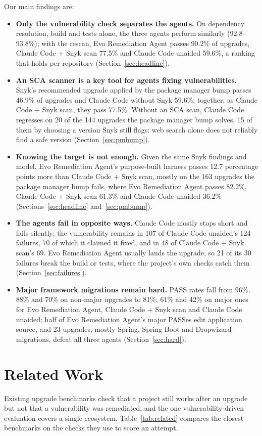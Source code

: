 \documentclass[11pt]{article}
\theoremstyle{definition}
\newcommand{\evo}{Evo Remediation Agent}
\newcommand{\aided}{Claude Code + Snyk scan}
\newcommand{\unaided}{Claude Code unaided}
\newcommand{\pmbump}{package manager bump}
\begin{document}
Our main findings are:
\begin{itemize}
  \item \textbf{Only the vulnerability check separates the agents.} On dependency resolution, build and tests alone, the three agents perform similarly (92.8--93.8\%); with the rescan, \evo{} passes 90.2\% of upgrades, \aided{} 77.5\% and \unaided{} 59.6\%, a ranking that holds per repository (Section~\ref{sec:headline}).
  \item \textbf{An SCA scanner is a key tool for agents fixing vulnerabilities.} Snyk's recommended upgrade applied by the \pmbump{} passes 46.9\% of upgrades and Claude Code without Snyk 59.6\%; together, as \aided{}, they pass 77.5\%. Without an SCA scan, Claude Code regresses on 20 of the 144 upgrades the \pmbump{} solves, 15 of them by choosing a version Snyk still flags: web search alone does not reliably find a safe version (Section~\ref{sec:pmbump}).
  \item \textbf{Knowing the target is not enough.} Given the same Snyk findings and model, \evo{}'s purpose-built harness passes 12.7 percentage points more than \aided{}, mostly on the 163 upgrades the \pmbump{} fails, where \evo{} passes 82.2\%, \aided{} 61.3\% and \unaided{} 36.2\% (Sections~\ref{sec:headline} and~\ref{sec:pmbump}).
  \item \textbf{The agents fail in opposite ways.} Claude Code mostly stops short and fails silently: the vulnerability remains in 107 of \unaided{}'s 124 failures, 70 of which it claimed it fixed, and in 48 of \aided{}'s 69. \evo{} usually lands the upgrade, so 21 of its 30 failures break the build or tests, where the project's own checks catch them (Section~\ref{sec:failures}).
  \item \textbf{Major framework migrations remain hard.} PASS rates fall from 96\%, 88\% and 70\% on non-major upgrades to 81\%, 61\% and 42\% on major ones for \evo{}, \aided{} and \unaided{}; half of \evo{}'s major PASSes edit application source, and 23 upgrades, mostly Spring, Spring Boot and Dropwizard migrations, defeat all three agents (Section~\ref{sec:hard}).
\end{itemize}

\section{Related Work}
\label{sec:related}

Existing upgrade benchmarks check that a project still works after an upgrade but not that a vulnerability was remediated, and the one vulnerability-driven evaluation covers a single ecosystem. Table~\ref{tab:related} compares the closest benchmarks on the checks they use to score an attempt.
\end{document}
